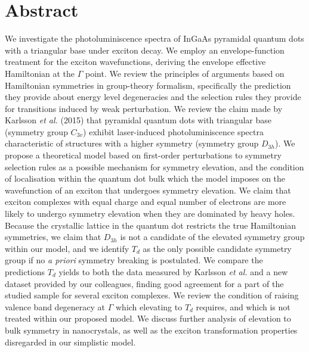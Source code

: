 \documentclass[12pt]{article}
\begin{document}







\section{Abstract}
We investigate the photoluminiscence spectra of InGaAs pyramidal quantum dots with a triangular base under exciton decay. We employ an envelope-function treatment for the exciton wavefunctions, deriving the envelope effective Hamiltonian at the $\Gamma$ point. We review the principles of arguments based on Hamiltonian symmetries in group-theory formalism, specifically the prediction they provide about energy level degeneracies and the selection rules they provide for transitions induced by weak perturbation. We review the claim made by Karlsson \textit{et al.} (2015) that pyramidal quantum dots with triangular base (symmetry group $C_{3v}$) exhibit laser-induced photoluminiscence spectra characteristic of structures with a higher symmetry (symmetry group $D_{3h}$). We propose a theoretical model based on first-order perturbations to symmetry selection rules as a possible mechanism for symmetry elevation, and the condition of localisation within the quantum dot bulk which the model imposes on the wavefunction of an exciton that undergoes symmetry elevation. We claim that exciton complexes with equal charge and equal number of electrons are more likely to undergo symmetry elevation when they are dominated by heavy holes. Because the crystallic lattice in the quantum dot restricts the true Hamiltonian symmetries, we claim that $D_{3h}$ is not a candidate of the elevated symmetry group within our model, and we identify $T_d$ as the only possible candidate symmetry group if no \textit{a priori} symmetry breaking is postulated. We compare the predictions $T_d$ yields to both the data measured by Karlsson \textit{et al.} and a new dataset provided by our colleagues, finding good agreement for a part of the studied sample for several exciton complexes. We review the condition of raising valence band degeneracy at $\Gamma$ which elevating to $T_d$ requires, and which is not treated within our proposed model. We discuss further analysis of elevation to bulk symmetry in nanocrystals, as well as the exciton transformation properties disregarded in our simplistic model.
\end{document}
